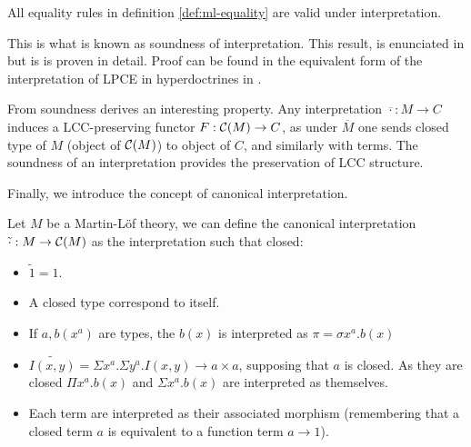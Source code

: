 \begin{definition}
\begin{proposition}[Soundness]
All equality rules in definition \ref{def:ml-equality} are valid under interpretation.
\end{proposition}


This is what is known as soundness of interpretation. This result, is enunciated in \cite[proposition 4.5]{seely1984locally} but is is proven in detail. Proof can be found in the equivalent form of the interpretation of LPCE in hyperdoctrines in \cite{seely1983hyperdoctrines}.

\begin{remark}\label{rem:induced-functor} From soundness derives an interesting property. Any interpretation $\overline{\cdot}: M \to C$ induces a LCC-preserving functor $F:\mathcal{C} (M) \to C$, as under $\overline M$ one sends closed type of $M$ (object of $\mathcal{C} (M)$) to object of $C$, and similarly with terms. The soundness of an interpretation provides the preservation of LCC structure. 
\end{remark}


Finally, we introduce the concept of canonical interpretation.

\begin{definition}
  Let $M$ be a Martin-L\"of theory, we can define the canonical interpretation $\tilde \cdot: M\to \mathcal{C}(M)$ as the interpretation such that closed:
  \begin{itemize}
  \item $\tilde 1 = 1$.
  \item A closed type correspond to itself.
  \item If $a, b(x^a)$ are types, the $b(x)$ is interpreted as $\pi = \sigma x^a.b(x)$
  \item $\widetilde{I(x,y)} = \Sigma x^a.\Sigma y^a. I(x,y) \to a\times a$, supposing that $a$ is closed. As they are closed $\Pi x^a.b(x)$ and $\Sigma x^a.b(x)$ are interpreted as themselves.
  \item Each term are interpreted as their associated morphism (remembering that a closed term $a$ is equivalent to a function term $a\to 1$).
  \end{itemize}
\end{definition}


\end{definition}
